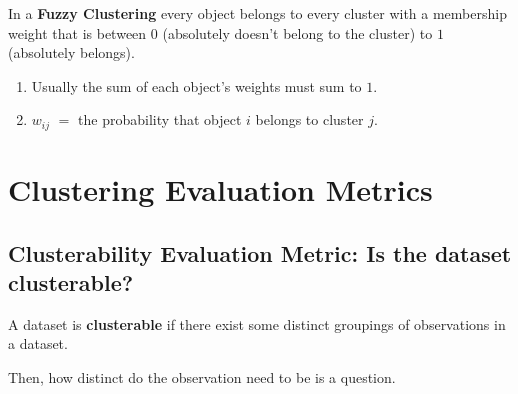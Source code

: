 \documentclass[11pt]{elegantbook}
\begin{document}
\begin{definition}
    In a \textbf{Fuzzy Clustering} every object belongs to every cluster with a membership weight that is between $0$ (absolutely doesn't belong to the cluster) to $1$ (absolutely belongs).
    \begin{enumerate}
        \item Usually the sum of each object's weights must sum to $1$.
        \item $w_{ij}$ $=$ the probability that object $i$ belongs to cluster $j$.
    \end{enumerate}
\end{definition}








\chapter{Clustering Evaluation Metrics}
\section{Clusterability Evaluation Metric: Is the dataset clusterable?}
\begin{definition}
    A dataset is \textbf{clusterable} if there exist some distinct groupings of observations in a dataset.
\end{definition}
Then, how distinct do the observation need to be is a question.
\end{document}
